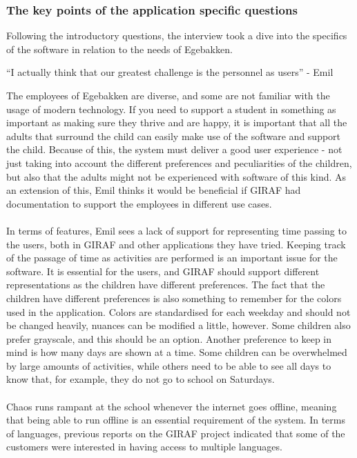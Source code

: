 \subsubsection{The key points of the application specific questions}
Following the introductory questions, the interview took a dive into the specifics of the software in relation to the needs of Egebakken.
\begin{displayquote}
    ``I actually think that our greatest challenge is the personnel as users''  - Emil
\end{displayquote}
The employees of Egebakken are diverse, and some are not familiar with the usage of modern technology.
If you need to support a student in something as important as making sure they thrive and are happy, it is important that all the adults that surround the child can easily make use of the software and support the child.
Because of this, the system must deliver a good user experience - not just taking into account the different preferences and peculiarities of the children, but also that the adults might not be experienced with software of this kind.
As an extension of this, Emil thinks it would be beneficial if GIRAF had documentation to support the employees in different use cases.
\\\\
In terms of features, Emil sees a lack of support for representing time passing to the users, both in GIRAF and other applications they have tried.
Keeping track of the passage of time as activities are performed is an important issue for the software.
It is essential for the users, and GIRAF should support different representations as the children have different preferences.
The fact that the children have different preferences is also something to remember for the colors used in the application.
Colors are standardised for each weekday and should not be changed heavily, nuances can be modified a little, however.
Some children also prefer grayscale, and this should be an option.
Another preference to keep in mind is how many days are shown at a time.
Some children can be overwhelmed by large amounts of activities, while others need to be able to see all days to know that, for example, they do not go to school on Saturdays.
\\\\
Chaos runs rampant at the school whenever the internet goes offline, meaning that being able to run offline is an essential requirement of the system.
In terms of languages, previous reports on the GIRAF project indicated that some of the customers were interested in having access to multiple languages.
